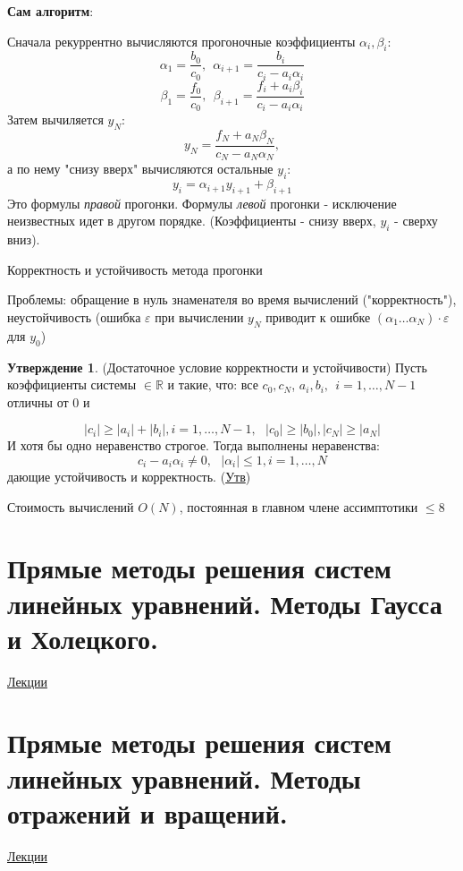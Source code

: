 \documentclass[specialist, subf, href, colorlinks=true, 12pt, times, mtpro, final]{disser}
\theoremstyle{definition}
\newtheorem{state}{Утверждение}[section]
\begin{document}
	{\bf Сам алгоритм}:
	
	Сначала рекуррентно вычисляются прогоночные коэффициенты $\alpha_i, \beta_i$:
	$$
	   \alpha_1 = \frac{b_0}{c_0}, \ \ \alpha_{i+1} = \frac{b_i}{c_i - a_i \alpha_i}
	$$
	$$
	   \beta_1 = \frac{f_0}{c_0}, \ \ \beta_{i+1} = \frac{f_i + a_i \beta_i}{c_i - a_i \alpha_i}
	$$
	Затем вычиляется $y_N$:
	$$
	   y_N = \frac{f_N + a_N \beta_N}{c_N - a_N \alpha_N},
	$$
	а по нему "снизу вверх" вычисляются остальные $y_i$:
	$$
	   y_i = \alpha_{i+1} y_{i+1} + \beta_{i+1}
	$$
	Это формулы \emph{правой} прогонки. Формулы \emph{левой} прогонки - исключение неизвестных идет в другом порядке. (Коэффициенты - снизу вверх, $y_i$ - сверху вниз).

	\begin{center}
	Корректность и устойчивость метода прогонки 
	\end{center} 

	Проблемы: обращение в нуль знаменателя во время вычислений ("корректность"), неустойчивость (ошибка $\varepsilon$ при вычислении $y_N$ приводит к ошибке $(\alpha_1 \dots \alpha_N) \cdot \varepsilon$ для $y_0$) 

	\begin{state}
		(Достаточное условие корректности и устойчивости) Пусть коэффициенты системы $\in \mathbb{R}$ и такие, что: все $c_0, c_N$, $a_i, b_i, \ \ i = 1, \dots, N-1$ отличны от 0 и 
	
		$$|c_i| \ge |a_i|+|b_i|, i = 1, \dots, N-1, \ \ \ |c_0| \ge |b_0|, |c_N| \ge |a_N|$$
		И хотя бы одно неравенство строгое. Тогда выполнены неравенства:
		$$c_i - a_i\alpha_i \ne 0, \ \ \ |\alpha_i| \le 1, i = 1, \dots, N$$
		дающие устойчивость и корректность.
(\hyperlink {lects.51}{Утв})
	\end{state}
	
	Стоимость вычислений $O(N)$, постоянная в главном члене ассимптотики $\le 8$
\section {Прямые методы решения систем линейных уравнений. Методы Гаусса и Холецкого.}
	\hyperlink {lects.51}{Лекции}\\

\section {Прямые методы решения систем линейных уравнений. Методы отражений и вращений.}
	\hyperlink {lects.54}{Лекции}\\
\end{document}
